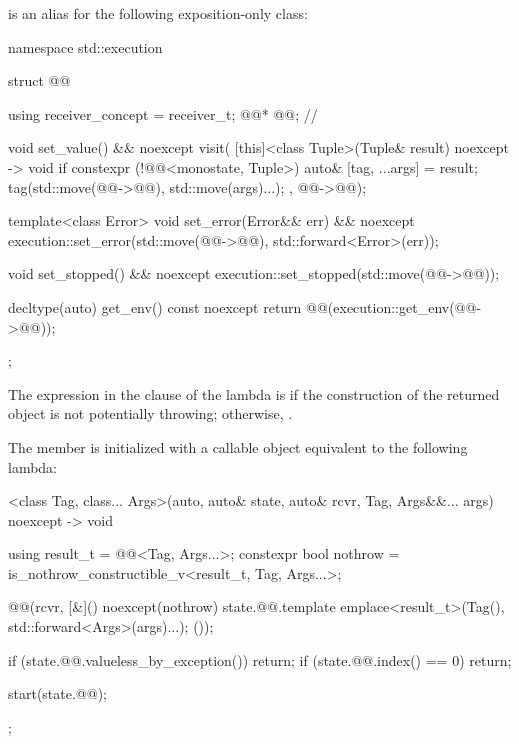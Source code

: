\pnum
{} is an alias for the following exposition-only class:
\begin{codeblock}
namespace std::execution {
  struct @@ {
    using receiver_concept = receiver_t;
    @@* @@;          // \expos

    void set_value() && noexcept {
      visit(
        [this]<class Tuple>(Tuple& result) noexcept -> void {
          if constexpr (!@@<monostate, Tuple>) {
            auto& [tag, ...args] = result;
            tag(std::move(@@->@@), std::move(args)...);
          }
        },
        @@->@@);
    }

    template<class Error>
    void set_error(Error&& err) && noexcept {
      execution::set_error(std::move(@@->@@), std::forward<Error>(err));
    }

    void set_stopped() && noexcept {
      execution::set_stopped(std::move(@@->@@));
    }

    decltype(auto) get_env() const noexcept {
      return @@(execution::get_env(@@->@@));
    }
  };
}
\end{codeblock}

\pnum
The expression in the  clause of the lambda is 
if the construction of the returned  object
is not potentially throwing;
otherwise, .

\pnum
The member 
is initialized with a callable object equivalent to the following lambda:
\begin{codeblock}
[]<class Tag, class... Args>(auto, auto& state, auto& rcvr, Tag, Args&&... args) noexcept
    -> void {
  using result_t = @@<Tag, Args...>;
  constexpr bool nothrow = is_nothrow_constructible_v<result_t, Tag, Args...>;

  @@(rcvr, [&]() noexcept(nothrow) {
    state.@@.template emplace<result_t>(Tag(), std::forward<Args>(args)...);
  }());

  if (state.@@.valueless_by_exception())
    return;
  if (state.@@.index() == 0)
    return;

  start(state.@@);
};
\end{codeblock}

